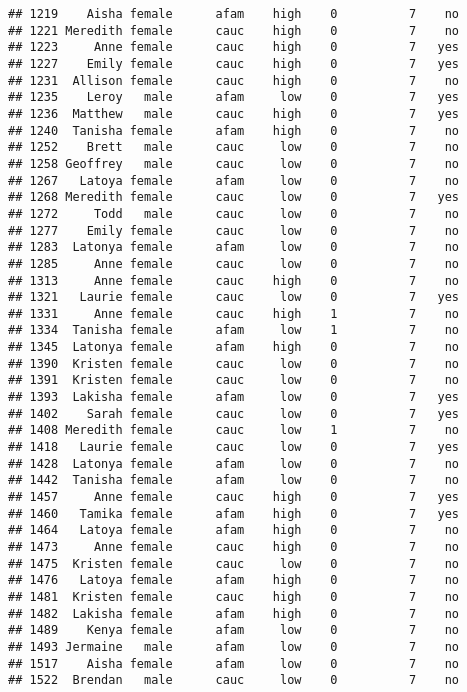 \documentclass[
]{article}
\begin{document}
\begin{verbatim}
## 1219    Aisha female      afam    high    0          7    no
## 1221 Meredith female      cauc    high    0          7    no
## 1223     Anne female      cauc    high    0          7   yes
## 1227    Emily female      cauc    high    0          7   yes
## 1231  Allison female      cauc    high    0          7    no
## 1235    Leroy   male      afam     low    0          7   yes
## 1236  Matthew   male      cauc    high    0          7   yes
## 1240  Tanisha female      afam    high    0          7    no
## 1252    Brett   male      cauc     low    0          7    no
## 1258 Geoffrey   male      cauc     low    0          7    no
## 1267   Latoya female      afam     low    0          7    no
## 1268 Meredith female      cauc     low    0          7   yes
## 1272     Todd   male      cauc     low    0          7    no
## 1277    Emily female      cauc     low    0          7    no
## 1283  Latonya female      afam     low    0          7    no
## 1285     Anne female      cauc     low    0          7    no
## 1313     Anne female      cauc    high    0          7    no
## 1321   Laurie female      cauc     low    0          7   yes
## 1331     Anne female      cauc    high    1          7    no
## 1334  Tanisha female      afam     low    1          7    no
## 1345  Latonya female      afam    high    0          7    no
## 1390  Kristen female      cauc     low    0          7    no
## 1391  Kristen female      cauc     low    0          7    no
## 1393  Lakisha female      afam     low    0          7   yes
## 1402    Sarah female      cauc     low    0          7   yes
## 1408 Meredith female      cauc     low    1          7    no
## 1418   Laurie female      cauc     low    0          7   yes
## 1428  Latonya female      afam     low    0          7    no
## 1442  Tanisha female      afam     low    0          7    no
## 1457     Anne female      cauc    high    0          7   yes
## 1460   Tamika female      afam    high    0          7   yes
## 1464   Latoya female      afam    high    0          7    no
## 1473     Anne female      cauc    high    0          7    no
## 1475  Kristen female      cauc     low    0          7    no
## 1476   Latoya female      afam    high    0          7    no
## 1481  Kristen female      cauc    high    0          7    no
## 1482  Lakisha female      afam    high    0          7    no
## 1489    Kenya female      afam     low    0          7    no
## 1493 Jermaine   male      afam     low    0          7    no
## 1517    Aisha female      afam     low    0          7    no
## 1522  Brendan   male      cauc     low    0          7    no

\end{verbatim}
\end{document}
